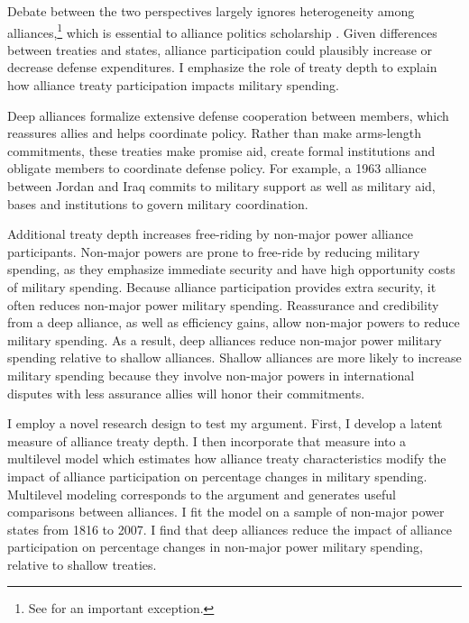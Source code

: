 \documentclass[12pt]{article}
\begin{document}
Debate between the two perspectives largely ignores heterogeneity among alliances,\footnote{See \citet{DigiuseppePoast2016} for an important exception.} which is essential to alliance politics scholarship \citep{Morrow1991, Leeds2003, LeedsAnac2005, Fordham2010, Mattes2012, Benson2012, Poast2013, Johnsonetal2015}.  
Given differences between treaties and states, alliance participation could plausibly increase or decrease defense expenditures. 
I emphasize the role of treaty depth to explain how alliance treaty participation impacts military spending. 


Deep alliances formalize extensive defense cooperation between members, which reassures allies and helps coordinate policy. 
Rather than make arms-length commitments, these treaties make promise aid, create formal institutions and obligate members to coordinate defense policy. 
For example, a 1963 alliance between Jordan and Iraq commits to military support as well as military aid, bases and institutions to govern military coordination. 


Additional treaty depth increases free-riding by non-major power alliance participants. 
Non-major powers are prone to free-ride by reducing military spending, as they emphasize immediate security and have high opportunity costs of military spending. 
Because alliance participation provides extra security, it often reduces non-major power military spending. 
Reassurance and credibility from a deep alliance, as well as efficiency gains, allow non-major powers to reduce military spending. 
As a result, deep alliances reduce non-major power military spending relative to shallow alliances. 
Shallow alliances are more likely to increase military spending because they involve non-major powers in international disputes with less assurance allies will honor their commitments. 
 

I employ a novel research design to test my argument.
First, I develop a latent measure of alliance treaty depth. 
I then incorporate that measure into a multilevel model which estimates how alliance treaty characteristics modify the impact of alliance participation on percentage changes in military spending.
Multilevel modeling corresponds to the argument and generates useful comparisons between alliances. 
I fit the model on a sample of non-major power states from 1816 to 2007. 
I find that deep alliances reduce the impact of alliance participation on percentage changes in non-major power military spending, relative to shallow treaties.
\end{document}
